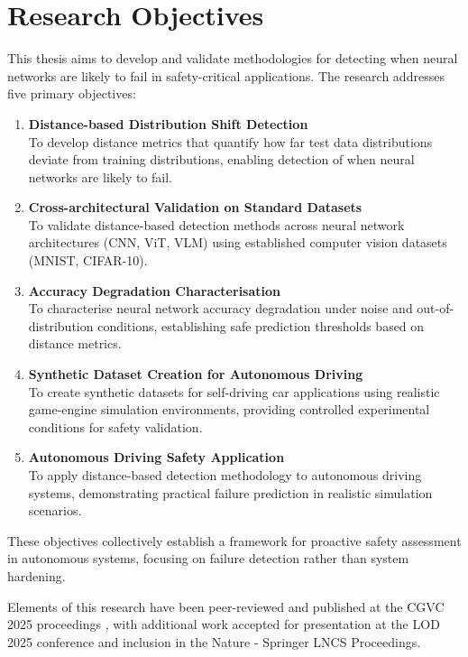 
\section{Research Objectives}

This thesis aims to develop and validate methodologies for detecting when neural networks are likely to fail in safety-critical applications. The research addresses five primary objectives:

\begin{enumerate}
\item \textbf{Distance-based Distribution Shift Detection} \\
To develop distance metrics that quantify how far test data distributions deviate from training distributions, enabling detection of when neural networks are likely to fail.

\item \textbf{Cross-architectural Validation on Standard Datasets} \\
To validate distance-based detection methods across neural network architectures (CNN, ViT, VLM) using established computer vision datasets (MNIST, CIFAR-10).

\item \textbf{Accuracy Degradation Characterisation} \\
To characterise neural network accuracy degradation under noise and out-of-distribution conditions, establishing safe prediction thresholds based on distance metrics.

\item \textbf{Synthetic Dataset Creation for Autonomous Driving} \\
To create synthetic datasets for self-driving car applications using realistic game-engine simulation environments, providing controlled experimental conditions for safety validation.

\item \textbf{Autonomous Driving Safety Application} \\
To apply distance-based detection methodology to autonomous driving systems, demonstrating practical failure prediction in realistic simulation scenarios.
\end{enumerate}

These objectives collectively establish a framework for proactive safety assessment in autonomous systems, focusing on failure detection rather than system hardening.

Elements of this research have been peer-reviewed and published at the CGVC 2025 proceedings \cite{sikar2024misclassificationlikelihoodmatrixclasses}, with additional work accepted for presentation at the LOD 2025 \cite{sikar2025explorationssoftmaxspaceknowing} conference and inclusion in the Nature - Springer LNCS Proceedings.